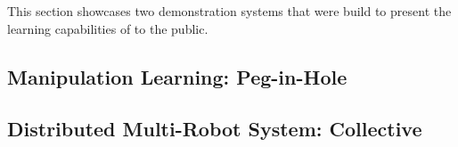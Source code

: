 This section showcases two demonstration systems that were build to present the learning capabilities of \softwareabbr{} to the public.

\subsection{Manipulation Learning: Peg-in-Hole}\label{ch:architecture:learning:insertion}

\subsection{Distributed Multi-Robot System: Collective}\label{ch:architecture:learning:collective}
